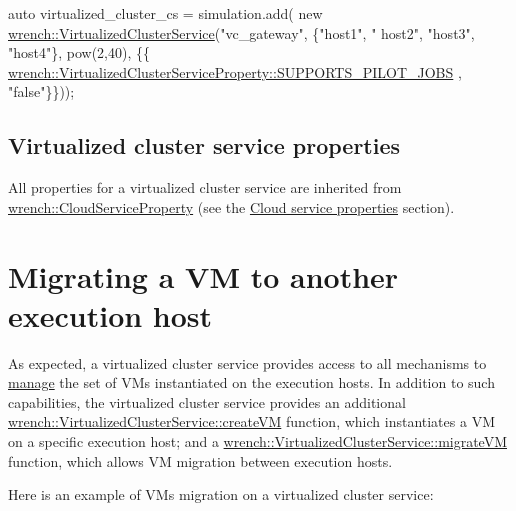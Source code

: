 \begin{DoxyCode}
\textcolor{keyword}{auto} virtualized\_cluster\_cs = simulation.add(
          \textcolor{keyword}{new} \hyperlink{classwrench_1_1_virtualized_cluster_service}{wrench::VirtualizedClusterService}(\textcolor{stringliteral}{"vc\_gateway"}, \{\textcolor{stringliteral}{"host1"}, \textcolor{stringliteral}{"
      host2"}, \textcolor{stringliteral}{"host3"}, \textcolor{stringliteral}{"host4"}\}, pow(2,40),
                                                \{\{
      \hyperlink{classwrench_1_1_compute_service_property_af0abab1e3bce4932c4482031f0c31ce8}{wrench::VirtualizedClusterServiceProperty::SUPPORTS\_PILOT\_JOBS}
      , \textcolor{stringliteral}{"false"}\}\}));
\end{DoxyCode}
\hypertarget{guide-virtualizedcluster_guide-virtualizedcluster-creating-properties}{}\subsection{Virtualized cluster service properties}\label{guide-virtualizedcluster_guide-virtualizedcluster-creating-properties}
All properties for a virtualized cluster service are inherited from {\ttfamily \hyperlink{classwrench_1_1_cloud_service_property}{wrench\+::\+Cloud\+Service\+Property}} (see the \hyperlink{guide-cloud_guide-cloud-creating-properties}{Cloud service properties} section).\hypertarget{guide-virtualizedcluster_guide-virtualizedcluster-migrating}{}\section{Migrating a V\+M to another execution host}\label{guide-virtualizedcluster_guide-virtualizedcluster-migrating}
As expected, a virtualized cluster service provides access to all mechanisms to \hyperlink{guide-cloud_guide-cloud-managing}{manage} the set of V\+Ms instantiated on the execution hosts. In addition to such capabilities, the virtualized cluster service provides an additional \hyperlink{classwrench_1_1_virtualized_cluster_service_afb90d549ca85f41946b155cff49e37ce}{wrench\+::\+Virtualized\+Cluster\+Service\+::create\+VM} function, which instantiates a VM on a specific execution host; and a \hyperlink{classwrench_1_1_virtualized_cluster_service_a0a81357e7af9b42bbb7b376c56a90611}{wrench\+::\+Virtualized\+Cluster\+Service\+::migrate\+VM} function, which allows VM migration between execution hosts.

Here is an example of V\+Ms migration on a virtualized cluster service\+:



